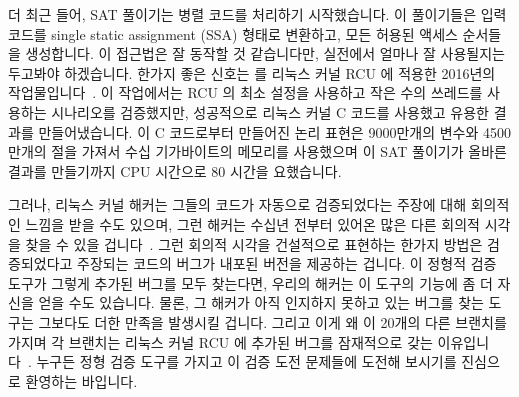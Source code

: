 \fi

더 최근 들어, SAT 풀이기는 병렬 코드를 처리하기 시작했습니다.
이 풀이기들은 입력 코드를 single static assignment (SSA) 형태로 변환하고, 모든
허용된 액세스 순서들을 생성합니다.
이 접근법은 잘 동작할 것 같습니다만, 실전에서 얼마나 잘 사용될지는 두고봐야
하겠습니다.
한가지 좋은 신호는  를 리눅스 커널 RCU 에 적용한 2016년의
작업물입니다~\cite{LihaoLiang2016VerifyTreeRCU,Liang:2018:VTB,LanceRoy2017CBMC-SRCU}.
이 작업에서는 RCU 의 최소 설정을 사용하고 작은 수의 쓰레드를 사용하는
시나리오를 검증했지만, 성공적으로 리눅스 커널 C 코드를 사용했고 유용한 결과를
만들어냈습니다.
이 C 코드로부터 만들어진 논리 표현은 9000만개의 변수와 4500만개의 절을 가져서
수십 기가바이트의 메모리를 사용했으며 이 SAT 풀이기가 올바른 결과를 만들기까지
CPU 시간으로 80 시간을 요했습니다.

그러나, 리눅스 커널 해커는 그들의 코드가 자동으로 검증되었다는 주장에 대해
회의적인 느낌을 받을 수도 있으며, 그런 해커는 수십년 전부터 있어온 많은 다른
회의적 시각을 찾을 수 있을 겁니다~\cite{DeMillo:1979:SPP:359104.359106}.
그런 회의적 시각을 건설적으로 표현하는 한가지 방법은 검증되었다고 주장되는
코드의 버그가 내포된 버전을 제공하는 겁니다.
이 정형적 검증 도구가 그렇게 추가된 버그를 모두 찾는다면, 우리의 해커는 이
도구의 기능에 좀 더 자신을 얻을 수도 있습니다.
물론, 그 해커가 아직 인지하지 못하고 있는 버그를 찾는 도구는 그보다도 더한
만족을 발생시킬 겁니다.
그리고 이게 왜  이 20개의 다른 브랜치를 가지며 각 브랜치는 리눅스 커널
RCU 에 추가된 버그를 잠재적으로 갖는
이유입니다~\cite{PaulEMcKenney2017VerificationChallenge6}.
누구든 정형 검증 도구를 가지고 이 검증 도전 문제들에 도전해 보시기를 진심으로
환영하는 바입니다.


